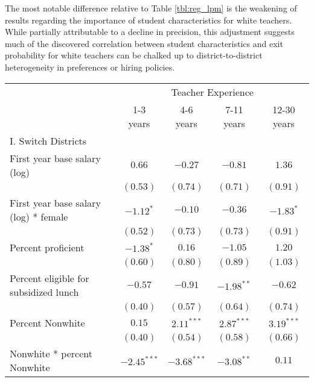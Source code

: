 \documentclass[12pt,]{article}
\begin{document}
The most notable difference relative to Table \ref{tbl:reg_lpm} is the
weakening of results regarding the importance of student characteristics
for white teachers. While partially attributable to a decline in
precision, this adjustment suggests much of the discovered correlation
between student characteristics and exit probability for white teachers
can be chalked up to district-to-district heterogeneity in preferences
or hiring policies.

\begin{sidewaystable}
\begin{center}
\begin{tabular}{l c c c c }
\hline
 & \multicolumn{4}{c}{Teacher Experience} \\ \cline{2-5}
 & 1-3 years & 4-6 years & 7-11 years & 12-30 years \\
\hline
I. Switch Districts                             &               &               &               &              \\
\quad First year base salary (log)           & $0.66$        & $-0.27$       & $-0.81$       & $1.36$       \\
                                                & $(0.53)$      & $(0.74)$      & $(0.71)$      & $(0.91)$     \\
\quad First year base salary (log) * female  & $-1.12^{*}$   & $-0.10$       & $-0.36$       & $-1.83^{*}$  \\
                                                & $(0.52)$      & $(0.73)$      & $(0.73)$      & $(0.91)$     \\
\quad Percent proficient                     & $-1.38^{*}$   & $0.16$        & $-1.05$       & $1.20$       \\
                                                & $(0.60)$      & $(0.80)$      & $(0.89)$      & $(1.03)$     \\
\quad Percent eligible for subsidized lunch  & $-0.57$       & $-0.91$       & $-1.98^{**}$  & $-0.62$      \\
                                                & $(0.40)$      & $(0.57)$      & $(0.64)$      & $(0.74)$     \\
\quad Percent Nonwhite                       & $0.15$        & $2.11^{***}$  & $2.87^{***}$  & $3.19^{***}$ \\
                                                & $(0.40)$      & $(0.54)$      & $(0.58)$      & $(0.66)$     \\
\quad Nonwhite * percent Nonwhite            & $-2.45^{***}$ & $-3.68^{***}$ & $-3.08^{**}$  & $0.11$       \\

\end{tabular}
\end{center}
\end{sidewaystable}
\end{document}

